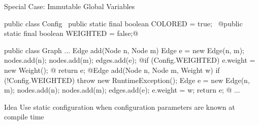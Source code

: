 \begin{frame}[fragile]{Special Case: Immutable Global Variables}
	\begin{mycolumns}
\begin{tiny}
\begin{codetight}{}
public class Config {
	~public static final boolean COLORED = true;~
	@public static final boolean WEIGHTED = false;@
}
\end{codetight}
\begin{codetight}{}
public class Graph {
	...
	Edge add(Node n, Node m) {
		Edge e = new Edge(n, m);
		nodes.add(n); nodes.add(m); edges.add(e);
		@if (Config.WEIGHTED) { e.weight = new Weight(); }@
		return e;
	}
	@Edge add(Node n, Node m, Weight w) {
		if (!Config.WEIGHTED) { throw new RuntimeException(); }
		Edge e = new Edge(n, m);
		nodes.add(n); nodes.add(m); edges.add(e);
		e.weight = w;
		return e;
	}@
	...
}
\end{codetight}
\end{tiny}	
	\mynextcolumn
		\begin{definition}{Idea}
			Use static configuration when configuration parameters are known at compile time
		\end{definition}
	\end{mycolumns}
\end{frame}

